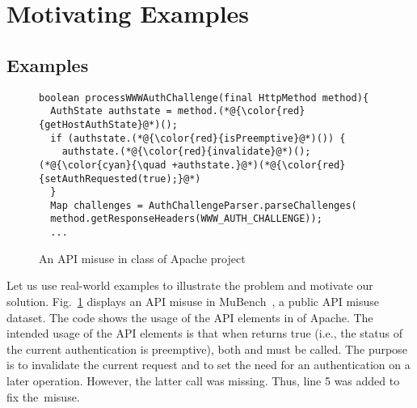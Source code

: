 \section{Motivating Examples}
\label{sec:motiv}

\subsection{Examples}

\begin{figure}[t]
	\centering
\begin{lstlisting}[]
boolean processWWWAuthChallenge(final HttpMethod method){
  AuthState authstate = method.(*@{\color{red}{getHostAuthState}@*)();
  if (authstate.(*@{\color{red}{isPreemptive}@*)()) {
    authstate.(*@{\color{red}{invalidate}@*)();
(*@{\color{cyan}{\quad +authstate.}@*)(*@{\color{red}{setAuthRequested(true);}@*)
  }
  Map challenges = AuthChallengeParser.parseChallenges(
  method.getResponseHeaders(WWW_AUTH_CHALLENGE));
  ...
\end{lstlisting}
        \vspace{-12pt}
        \caption{An API misuse in class  of
          Apache  project}
        \vspace{-6pt}
        \label{fig:example1}
\end{figure}


Let us use real-world examples to illustrate the problem and motivate
our solution. Fig.~\ref{fig:example1} displays an API misuse in
MuBench~\cite{mudetect-msr19}, a public API misuse dataset. The code
shows the usage of the API elements in  of Apache.
The intended usage of the API elements is that when
 returns true (i.e., the
status of the current authentication is preemptive), both
 and
 must be called. The
purpose is to invalidate the current request and to set the need for
an authentication on a later operation. However, the latter call was
missing. Thus, line 5 was added to fix the~misuse.

